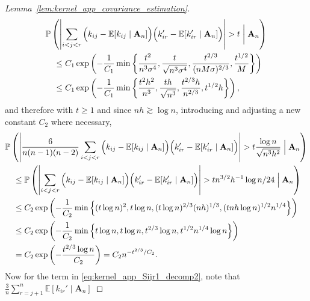 \documentclass[11pt,lof]{puthesis}
\renewcommand{\P}{\ensuremath{\mathbb{P}}}
\newcommand{\E}{\ensuremath{\mathbb{E}}}
\newcommand{\bA}{\ensuremath{\mathbf{A}}}
\theoremstyle{break}
\theoremstyle{proof}
\newtheorem{proof}{Proof}
\begin{document}
\begin{proof}[Lemma~\ref{lem:kernel_app_covariance_estimation}]
\begin{align*}
    &\P\left(
      \left|
        \sum_{i<j<r}
        \Big(
          k_{i j}
          - \E[k_{i j} \mid \bA_n]
        \Big)
        \Big(
          k_{i r}'
          - \E[k_{i r}' \mid \bA_n]
        \Big)
      \right|
      > t
      \biggm\vert \bA_n
    \right) \\
    &\quad\leq
    C_1 \exp\left(
      -\frac{1}{C_1}
      \min \left\{
        \frac{t^2}{n^3 \sigma^4},
        \frac{t}{\sqrt{n^3 \sigma^4}},
        \frac{t^{2/3}}{(n M \sigma)^{2/3}},
        \frac{t^{1/2}}{M}
      \right\}
    \right) \\
    &\quad\leq
    C_1 \exp\left(
      -\frac{1}{C_1}
      \min \left\{
        \frac{t^2 h^2}{n^3},
        \frac{t h}{\sqrt{n^3}},
        \frac{t^{2/3} h}{n^{2/3}},
        t^{1/2} h
      \right\}
    \right),
  \end{align*}
  and therefore
  with $t \geq 1$
  and since
  $n h \gtrsim \log n$,
  introducing and adjusting a new
  constant $C_2$ where necessary,
  \begin{align*}
    &\P\left(
      \left|
        \frac{6}{n(n-1)(n-2)}
        \sum_{i<j<r}
        \Big(
          k_{i j}
          - \E[k_{i j} \mid \bA_n]
        \Big)
        \Big(
          k_{i r}'
          - \E[k_{i r}' \mid \bA_n]
        \Big)
      \right|
      > t
      \frac{\log n}{\sqrt{n^3 h^2}}
      \Bigm\vert \bA_n
    \right) \\
    &\quad\leq
    \P\left(
      \left|
        \sum_{i<j<r}
        \Big(
          k_{i j}
          - \E[k_{i j} \mid \bA_n]
        \Big)
        \Big(
          k_{i r}'
          - \E[k_{i r}' \mid \bA_n]
        \Big)
      \right|
      > t
      n^{3/2} h^{-1} \log n / 24
      \Bigm\vert \bA_n
    \right) \\
    &\quad\leq
    C_2 \exp\left(
      -\frac{1}{C_2}
      \min \left\{
        (t \log n)^2,
        t \log n,
        (t \log n)^{2/3} (n h)^{1/3},
        (t n h \log n)^{1/2} n^{1/4}
      \right\}
    \right) \\
    &\quad\leq
    C_2 \exp\left(
      -\frac{1}{C_2}
      \min \left\{
        t \log n,
        t \log n,
        t^{2/3} \log n,
        t^{1/2} n^{1/4} \log n
      \right\}
    \right) \\
    &\quad=
    C_2 \exp\left(
      -\frac{t^{2/3} \log n}{C_2}
    \right)
    =
    C_2
    n^{-t^{2/3} / C_2}.
  \end{align*}
  Now for the term
  in \eqref{eq:kernel_app_Sijr1_decomp2},
  note that
  $\frac{3}{n} \sum_{r=j+1}^n \E[k_{i r}' \mid \bA_n]$

\end{proof}
\end{document}
